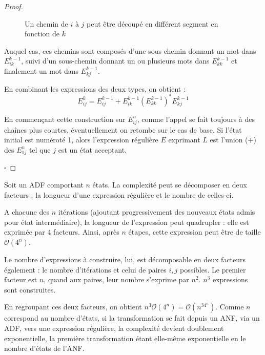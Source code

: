 \begin{proof}
\begin{figure}[H]
	\caption{Un chemin de $i$ à $j$ peut être découpé en différent segment en fonction de $k$}\label{fig:ikjpath}
	\end{figure}

	Auquel cas, ces chemins sont composés d'une sous-chemin donnant un mot dans $E_{ik}^{k-1}$, suivi d'un sous-chemin donnant un ou plusieurs mots dans $E_{kk}^{k-1}$ et finalement un mot dans $E_{kj}^{k-1}$.

	En combinant les expressions des deux types, on obtient :
	$$
	E_{ij}^k = E_{ij}^{k-1}+E_{ik}^{k-1}(E_{kk}^{k-1})^*E_{kj}^{k-1}
	$$

	En commençant cette construction sur $E_{ij}^n$, comme l'appel se fait toujours à des chaînes plus courtes, éventuellement on retombe sur le cas de base. Si l'état initial est numéroté 1, alors l'expression régulière $E$ exprimant $L$ est l'union ($+$) des $E_{1j}^n$ tel que $j$ est un état acceptant.

	\hfill$\square$
\end{proof}
\begin{complexity}
	Soit un ADF \automaton comportant $n$ états. La complexité peut se décomposer en deux facteurs : la longueur d'une expression régulière et le nombre de celles-ci.

	A chacune des $n$ itérations (ajoutant progressivement des nouveaux états admis pour état intermédiaire), la longueur de l'expression peut quadrupler : elle est exprimée par 4 facteurs. Ainsi, après $n$ étapes, cette expression peut être de taille $\mathcal{O}(4^n)$.

	Le nombre d'expressions à construire, lui, est décomposable en deux facteurs également : le nombre d'itérations et celui de paires $i,j$ possibles. Le premier facteur est $n$, quand aux paires, leur nombre s'exprime par $n^2$. $n^3$ expressions sont construites.

	En regroupant ces deux facteurs, on obtient $n^3\mathcal{O}(4^n)=\mathcal{O}(n^34^n)$. Comme $n$ correspond au nombre d'états, si la transformation se fait depuis un ANF, via un ADF, vers une expression régulière, la complexité devient doublement exponentielle, la première transformation étant elle-même exponentielle en le nombre d'états de l'ANF.
\end{complexity}


